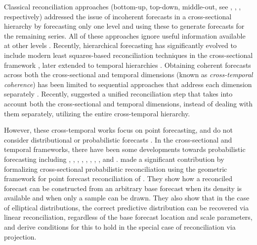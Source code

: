 \documentclass[review, 11pt]{elsarticle}
\theoremstyle{definition}
\begin{document}
Classical reconciliation approaches (bottom-up, top-down, middle-out, see \citealp{dunn1976}, \citealp{gross1990}, \citealp{athanasopoulos2009}, respectively) addressed the issue of incoherent forecasts in a cross-sectional hierarchy by forecasting only one level and using these to generate forecasts for the remaining series. All of these approaches ignore useful information available at other levels \citep{pennings2017}. Recently, hierarchical forecasting \citep{fliedner2001} has significantly evolved to include modern least squares-based reconciliation techniques in the cross-sectional framework \citep{hyndman2011, wickramasuriya2019, panagiotelis2021}, later extended to temporal hierarchies \citep{athanasopoulos2017, nystrup2020}.
Obtaining coherent forecasts across both the cross-sectional and temporal dimensions (known as \textit{cross-temporal coherence}) has been limited to sequential approaches that address each dimension separately \citep{kourentzes2019, yagli2019, punia2020, spiliotis2020}. Recently, \citet{difonzo2023} suggested a unified reconciliation step that takes into account both the cross-sectional and temporal dimensions, instead of dealing with them separately, utilizing the entire cross-temporal hierarchy.


However, these cross-temporal works focus on point forecasting, and do not consider distributional or probabilistic forecasts \citep{gneiting2014}. In the cross-sectional and temporal frameworks, there have been some developments towards probabilistic forecasting including  \cite{bentaieb2017}, \cite{panamtash2018}, \cite{jeon2019}, \cite{yang2020}, \cite{yagli2020},
\cite{bentaieb2021}, \cite{corani2021}, \cite{corani2022}, \cite{zambon2022} and \cite{wickramasuriya2021b}. \cite{panagiotelis2023} made a significant contribution by formalizing cross-sectional probabilistic reconciliation using the geometric framework for point forecast reconciliation of \cite{panagiotelis2021}. They show how a reconciled forecast can be constructed from an arbitrary base forecast when its density is available and when only a sample can be drawn. They also show that in the case of elliptical distributions, the correct predictive distribution can be recovered via linear reconciliation, regardless of the base forecast location and scale parameters, and derive conditions for this to hold in the special case of reconciliation via projection.
\end{document}

